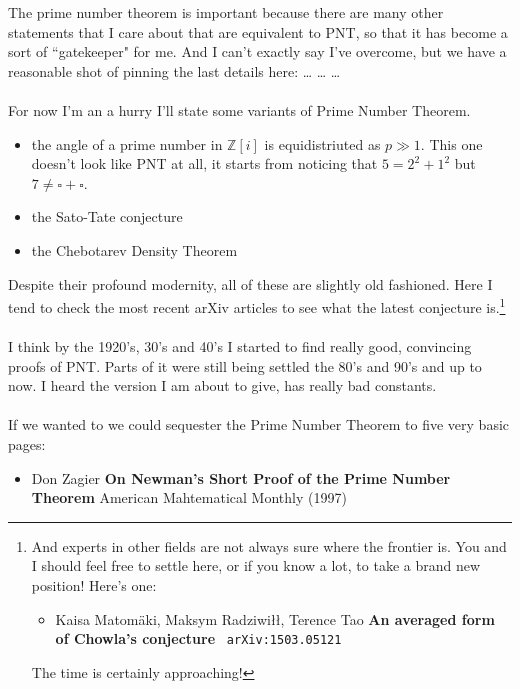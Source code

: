 \documentclass[12pt]{article}
\begin{document}
The prime number theorem is important because there are many other statements that I care about that are equivalent to PNT, so that it has become a sort of ``gatekeeper" for me.  And I can't exactly say I've overcome, but we have a reasonable shot of pinning the last details here: \dots \; \dots \; \dots \\ \\
For now I'm an a hurry I'll state some variants of Prime Number Theorem.  
\begin{itemize}
\item the angle of a prime number in $\mathbb{Z}[i]$ is equidistriuted as $p \gg 1$.  This one doesn't look like PNT at all, it starts from noticing that $5 = 2^2 + 1^2$ but $7 \neq \square + \square$. 
\item the Sato-Tate conjecture
\item the Chebotarev Density Theorem
\end{itemize}
Despite their profound modernity, all of these are slightly old fashioned.  Here I tend to check the most recent arXiv articles to see what the latest conjecture is.\footnote{And experts in other fields are not always sure where the frontier is.  You and I should feel free to settle here, or if you know a lot, to take a brand new position! Here's one:
\begin{itemize}
\item Kaisa Matom\"{a}ki, Maksym Radziwi\l\l, Terence Tao \textbf{An averaged form of Chowla's conjecture} \texttt{ arXiv:1503.05121}
\end{itemize}
The time is certainly approaching!
} \\ \\
I think by the 1920's, 30's and 40's I started to find really good, convincing proofs of PNT.  Parts of it were still being settled the 80's and 90's and up to now.  I heard the version I am about to give, has really bad constants.  \\ \\
If we wanted to we could sequester the Prime Number Theorem to five very basic pages:
\begin{itemize}
\item Don Zagier \textbf{On Newman's Short Proof of the Prime Number Theorem}  American Mahtematical Monthly (1997)
\end{itemize}


\newpage
\end{document}
